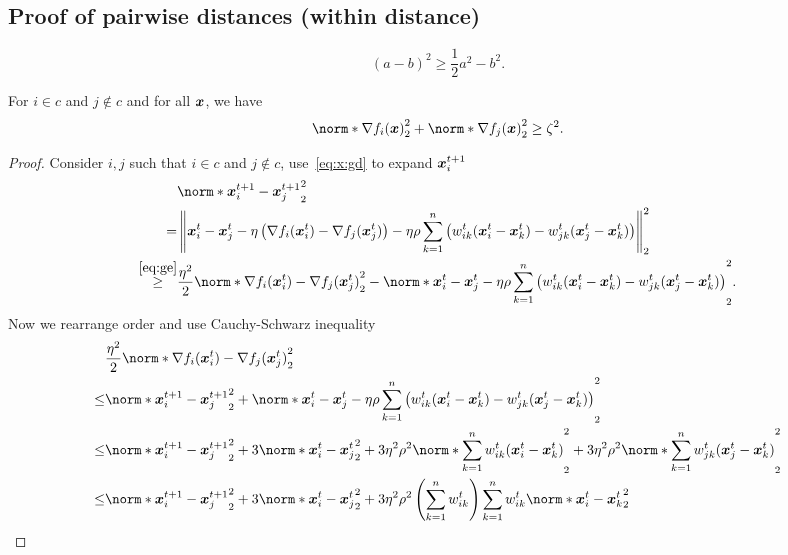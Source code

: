 \documentclass{article}
\begin{document}
\subsection{Proof of pairwise distances (within distance)}
\begin{equation}
  \label{eq:ge}
  (a-b)^2 \ge \frac{1}{2}a^2 - b^2.
\end{equation}
\begin{assumption}
  \label{a:uniform-lowerbound}
  For $i\in c$ and $j\notin c$ and for all $\bm{x}$, we have
  \begin{align*}
    \norm*{\nabla f_i(\xx)}_2^2  + \norm*{\nabla f_j(\xx)}_2^2 \ge \zeta^2.
  \end{align*}
\end{assumption}
\begin{proof}
  Consider $i,j$ such that $i\in c$ and $j\notin c$, use~\eqref{eq:x:gd} to expand $\bm{x}_i^{t+1}$
  \begin{align*}
    &\norm*{\xx_i^{t+1} - \xx_j^{t+1}}_2^2 \\
    =& \left\lVert\xx_i^t - \xx_j^t 
    - \eta \left(\nabla f_i(\xx^t_i) - \nabla f_j(\xx^t_j)\right)
    - \eta \rho \sum_{k=1}^n \left(
         w^t_{ik}(\xx^t_i - \xx^t_k) - w^t_{jk}(\xx^t_j - \xx^t_k)
    \right) \right\rVert_2^2 \\
    \stackrel{\eqref{eq:ge}}{\ge} & \frac{\eta^2}{2} \norm*{\nabla f_i(\xx^t_i) - \nabla f_j(\xx^t_j)}_2^2
    - \norm*{\xx_i^t - \xx_j^t - \eta \rho \sum_{k=1}^n \left(
      w^t_{ik}(\xx^t_i - \xx^t_k) - w^t_{jk}(\xx^t_j - \xx^t_k)
      \right)}_2^2.
  \end{align*}
  Now we rearrange order and use Cauchy-Schwarz inequality
  \begin{align*}
    &\frac{\eta^2}{2} \norm*{\nabla f_i(\xx^t_i) - \nabla f_j(\xx^t_j)}_2^2\\
    \le& 
    \norm*{\xx_i^{t+1} - \xx_j^{t+1}}_2^2 + \norm*{\xx_i^t - \xx_j^t - \eta \rho \sum_{k=1}^n \left(w^t_{ik}(\xx^t_i - \xx^t_k) - w^t_{jk}(\xx^t_j - \xx^t_k)\right)}_2^2 \\
    \le& 
    \norm*{\xx_i^{t+1} - \xx_j^{t+1}}_2^2 
    + 3\norm*{\xx_i^t - \xx_j^t}_2^2
    + 3\eta^2\rho^2\norm*{ \sum_{k=1}^n w^t_{ik}(\xx^t_i - \xx^t_k) }_2^2 
    + 3\eta^2\rho^2\norm*{ \sum_{k=1}^n w^t_{jk}(\xx^t_j - \xx^t_k)}_2^2\\
    \le& 
    \norm*{\xx_i^{t+1} - \xx_j^{t+1}}_2^2 
    + 3\norm*{\xx_i^t - \xx_j^t}_2^2
    + 3\eta^2\rho^2 \left(\sum_{k=1}^n w^t_{ik}\right)
    \sum_{k=1}^n w^t_{ik} \norm*{ \xx^t_i - \xx^t_k }_2^2  \\

\end{align*}
\end{proof}
\end{document}
